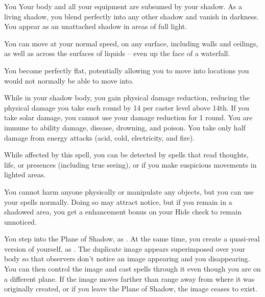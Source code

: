 \spelldur{\durmed \dismissable}
\begin{spelltarget}{You}
    \spelleffect Your body and all your equipment are subsumed by your shadow. As a living shadow, you blend perfectly into any other shadow and vanish in darkness. You appear as an unattached shadow in areas of full light.
    \par You can move at your normal speed, on any surface, including walls and ceilings, as well as across the surfaces of liquids -- even up the face of a waterfall.
    \par You become perfectly flat, potentially allowing you to move into locations you would not normally be able to move into.
    \par While in your shadow body, you gain physical damage reduction, reducing the physical damage you take each round by 14  per caster level above 14th. If you take solar damage, you cannot use your damage reduction for 1 round. You are immune to ability damage, disease, drowning, and poison. You take only half damage from energy attacks (acid, cold, electricity, and fire).
    \par While affected by this spell, you can be detected by spells that read thoughts, life, or presences (including true seeing), or if you make suspicious movements in lighted areas.
    \par You cannot harm anyone physically or manipulate any objects, but you can use your spells normally. Doing so may attract notice, but if you remain in a shadowed area, you get a  enhancement bonus on your Hide check to remain unnoticed.
\end{spelltarget}

\spelldur{\durmed}
\spellline
\spelleffect You step into the Plane of Shadow, as . At the same time, you create a quasi-real version of yourself, as . The duplicate image appears superimposed over your body so that observers don't notice an image appearing and you disappearing. You can then control the image and cast spells through it even though you are on a different plane.
\spellnotes If the image moves farther than \rnglong range away from where it was originally created, or if you leave the Plane of Shadow, the image ceases to exist.

